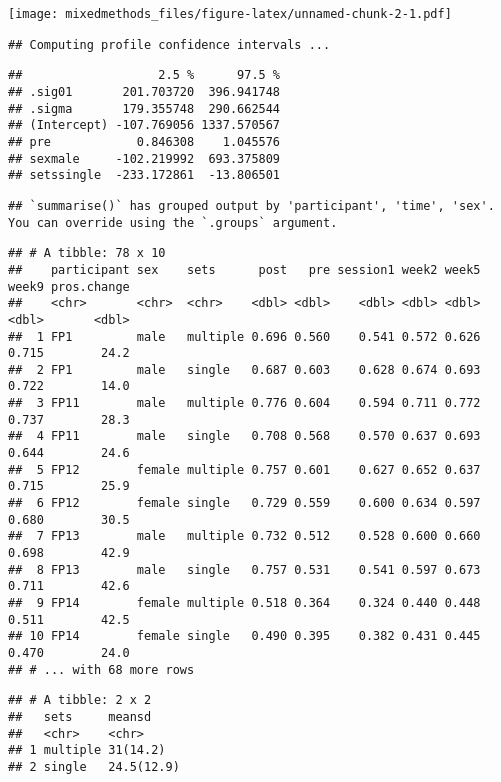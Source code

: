 \documentclass[
]{article}
\begin{document}
\texttt{[image: mixedmethods\_files/figure-latex/unnamed-chunk-2-1.pdf]}

\begin{verbatim}
## Computing profile confidence intervals ...
\end{verbatim}

\begin{verbatim}
##                   2.5 %      97.5 %
## .sig01       201.703720  396.941748
## .sigma       179.355748  290.662544
## (Intercept) -107.769056 1337.570567
## pre            0.846308    1.045576
## sexmale     -102.219992  693.375809
## setssingle  -233.172861  -13.806501
\end{verbatim}

\begin{verbatim}
## `summarise()` has grouped output by 'participant', 'time', 'sex'. You can override using the `.groups` argument.
\end{verbatim}

\begin{verbatim}
## # A tibble: 78 x 10
##    participant sex    sets      post   pre session1 week2 week5 week9 pros.change
##    <chr>       <chr>  <chr>    <dbl> <dbl>    <dbl> <dbl> <dbl> <dbl>       <dbl>
##  1 FP1         male   multiple 0.696 0.560    0.541 0.572 0.626 0.715        24.2
##  2 FP1         male   single   0.687 0.603    0.628 0.674 0.693 0.722        14.0
##  3 FP11        male   multiple 0.776 0.604    0.594 0.711 0.772 0.737        28.3
##  4 FP11        male   single   0.708 0.568    0.570 0.637 0.693 0.644        24.6
##  5 FP12        female multiple 0.757 0.601    0.627 0.652 0.637 0.715        25.9
##  6 FP12        female single   0.729 0.559    0.600 0.634 0.597 0.680        30.5
##  7 FP13        male   multiple 0.732 0.512    0.528 0.600 0.660 0.698        42.9
##  8 FP13        male   single   0.757 0.531    0.541 0.597 0.673 0.711        42.6
##  9 FP14        female multiple 0.518 0.364    0.324 0.440 0.448 0.511        42.5
## 10 FP14        female single   0.490 0.395    0.382 0.431 0.445 0.470        24.0
## # ... with 68 more rows
\end{verbatim}

\begin{verbatim}
## # A tibble: 2 x 2
##   sets     meansd    
##   <chr>    <chr>     
## 1 multiple 31(14.2)  
## 2 single   24.5(12.9)
\end{verbatim}
\end{document}
